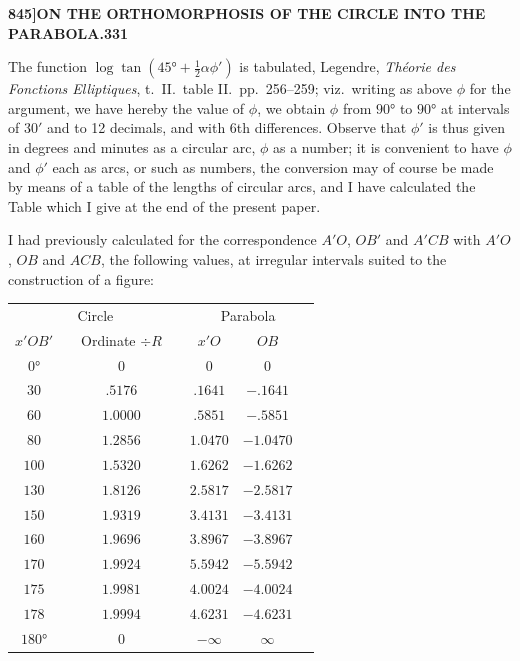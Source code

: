 \documentclass[12pt,a4paper]{article}
\theoremstyle{definition}
\begin{document}
\newpage
\setcounter{page}{331}

\noindent\textbf{845]}\hfill\textbf{ON THE ORTHOMORPHOSIS OF THE CIRCLE INTO THE PARABOLA.}\hfill\textbf{331}

\bigskip

\noindent The function $\log\tan(45° + \tfrac{1}{2}\alpha\phi')$ is tabulated, Legendre, \textit{Th\'eorie des Fonctions Elliptiques}, t.\ II.\ table II.\ pp.\ 256--259; viz.\ writing as above $\phi$ for the argument, we have hereby the value of $\phi$, we obtain $\phi$ from $90°$ to $90°$ at intervals of $30'$ and to 12 decimals, and with 6th differences. Observe that $\phi'$ is thus given in degrees and minutes as a circular arc, $\phi$ as a number; it is convenient to have $\phi$ and $\phi'$ each as arcs, or such as numbers, the conversion may of course be made by means of a table of the lengths of circular arcs, and I have calculated the Table which I give at the end of the present paper.

I had previously calculated for the correspondence $A'O$, $OB'$ and $A'CB$ with $A'O$, $OB$ and $ACB$, the following values, at irregular intervals suited to the construction of a figure:

\medskip
\begin{center}
\small
\begin{tabular}{c|c|c|c|c|c|c}
\multicolumn{4}{c|}{Circle} & \multicolumn{3}{c}{Parabola} \\
$x'OB'$ & & Ordinate $\div R$ & & $x'O$ & $OB$ & \\
\hline
$0°$ & & $0$ & & $0$ & $0$ & \\
$30$ & & $.5176$ & & $.1641$ & $-.1641$ & \\
$60$ & & $1.0000$ & & $.5851$ & $-.5851$ & \\
$80$ & & $1.2856$ & & $1.0470$ & $-1.0470$ & \\
$100$ & & $1.5320$ & & $1.6262$ & $-1.6262$ & \\
$130$ & & $1.8126$ & & $2.5817$ & $-2.5817$ & \\
$150$ & & $1.9319$ & & $3.4131$ & $-3.4131$ & \\
$160$ & & $1.9696$ & & $3.8967$ & $-3.8967$ & \\
$170$ & & $1.9924$ & & $5.5942$ & $-5.5942$ & \\
$175$ & & $1.9981$ & & $4.0024$ & $-4.0024$ & \\
$178$ & & $1.9994$ & & $4.6231$ & $-4.6231$ & \\
$180°$ & & $0$ & & $-\infty$ & $\infty$ &
\end{tabular}
\end{center}
\medskip
\end{document}

